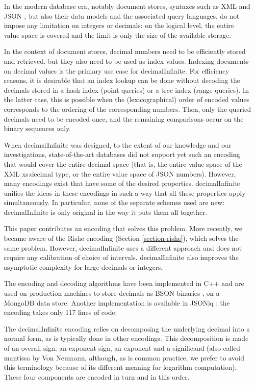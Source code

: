 \documentclass{acm_proc_article-sp}
\begin{document}
In the modern database era, notably document stores, syntaxes such as XML \cite{XML} and JSON \cite{JSON}, but also their data models and the associated query languages, do not impose any limitation on integers or decimals: on the logical level, the entire value space is covered and the limit is only the size of the available storage.

In the context of document stores, decimal numbers need to be efficiently stored and retrieved, but they also need to be used as index values. Indexing documents on decimal values is the primary use case for decimalInfinite. For efficiency reasons, it is desirable that an index lookup can be done without decoding the decimals stored in a hash index (point queries) or a tree index (range queries). In the latter case, this is possible when the (lexicographical) order of encoded values corresponds to the ordering of the corresponding numbers. Then, only the queried decimals need to be encoded once, and the remaining comparisons occur on the binary sequences only. 

When decimalInfinite was designed, to the extent of our knowledge and our investigations, state-of-the-art databases did not support yet such an encoding that would cover the entire decimal space (that is, the entire value space of the XML xs:decimal type, or the entire value space of JSON numbers). However, many encodings exist that have some of the desired properties. decimalInfinite unifies the ideas in these encodings in such a way that all these properties apply simultaneously. In particular, none of the separate schemes used are new: decimalInfinite is only original in the way it puts them all together.

This paper contributes an encoding that solves this problem. More recently, we became aware of the Rishe encoding (Section \ref{section-rishe}), which solves the same problem. However, decimalInfinite uses a different approach and does not require any calibration of choice of intervals. decimalInfinite also improves the asymptotic complexity for large decimals or integers.

The encoding and decoding algorithms have been implemented in C++ and are used on production machines to store decimals as BSON binaries \cite{BSON}, on a MongoDB \cite{MongoDB} data store. Another implementation is available in JSONiq \cite{decimalInfiniteJSONiq}: the encoding takes only 117 lines of code.

The decimalInfinite encoding relies on decomposing the underlying decimal into a normal form, as is typically done in other encodings. This decomposition is made of an overall sign, an exponent sign, an exponent and a significand (also called mantissa by Von Neumann, although, as is common practice, we prefer to avoid this terminology because of its different meaning for logarithm computation). These four components are encoded in turn and in this order.
\end{document}
